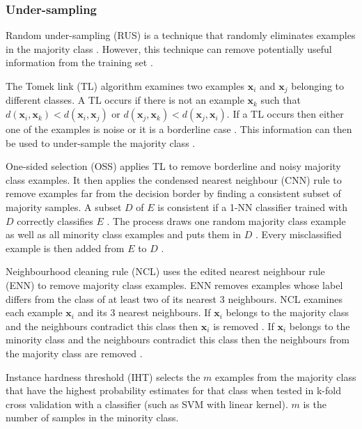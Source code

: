 \documentclass{sig-alternate-05-2015}
\begin{document}
	\subsubsection{Under-sampling}
	Random under-sampling (RUS) is a technique that randomly eliminates examples in the majority class \cite{Batista:2004:SBS:1007730.1007735}. However, this technique can remove potentially useful information from the training set \cite{Batista:2004:SBS:1007730.1007735}. 
	
	The Tomek link (TL) algorithm \cite{4309452} examines two examples $\textbf{x}_i$ and $\textbf{x}_j$ belonging to different classes. A TL occurs if there is not an example $\textbf{x}_k$ such that $d(\textbf{x}_i, \textbf{x}_k) < d(\textbf{x}_i, \textbf{x}_j)$ or $d(\textbf{x}_j, \textbf{x}_k) < d(\textbf{x}_j, \textbf{x}_i)$. If a TL occurs then either one of the examples is noise or it is a borderline case \cite{Batista:2004:SBS:1007730.1007735}. This information can then be used to under-sample the majority class \cite{Batista:2004:SBS:1007730.1007735}.
	
	One-sided selection (OSS) \cite{Kubat97addressingthe} applies TL to remove borderline and noisy majority class examples. It then applies the condensed nearest neighbour (CNN) rule to remove examples far from the decision border by finding a consistent subset of majority samples. A subset $D$ of $E$ is consistent if a 1-NN classifier trained with $D$ correctly classifies $E$ \cite{Batista:2004:SBS:1007730.1007735}. The process draws one random majority class example as well as all minority class examples and puts them in $D$ \cite{Batista:2004:SBS:1007730.1007735}. Every misclassified example is then added from $E$ to $D$ \cite{Batista:2004:SBS:1007730.1007735}.
	
	Neighbourhood cleaning rule (NCL) \cite{Laurikkala:2001:IID:648155.757340} uses the edited nearest neighbour rule (ENN) to remove majority class examples. ENN removes examples whose label differs from the class of at least two of its nearest 3 neighbours. NCL examines each example $\textbf{x}_i$ and its 3 nearest neighbours. If $\textbf{x}_i$ belongs to the majority class and the neighbours contradict this class then $\textbf{x}_i$ is removed \cite{Batista:2004:SBS:1007730.1007735}. If $\textbf{x}_i$ belongs to the minority class and the neighbours contradict this class then the neighbours from the majority class are removed \cite{Batista:2004:SBS:1007730.1007735}.
	
	Instance hardness threshold (IHT) \cite{Smith:2014:ILA:2843614.2843686} selects the $m$ examples from the majority class that have the highest probability estimates for that class when tested in k-fold cross validation with a classifier (such as SVM with linear kernel).  $m$ is the number of samples in the minority class.
	
\end{document}
